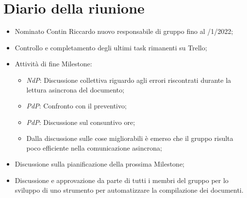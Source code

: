 \section{Diario della riunione}
\begin{itemize}
  \item Nominato Contin Riccardo nuovo responsabile di gruppo fino al 
  /1/2022;
  \item Controllo e completamento degli ultimi task rimanenti su Trello;
  \item Attività di fine Milestone:
  \begin{itemize}
    \item \textit{NdP}: Discussione collettiva riguardo agli errori riscontrati durante la lettura asincrona del documento;
    \item \textit{PdP}: Confronto con il preventivo;
    \item \textit{PdP}: Discussione sul consuntivo ore;
    \item Dalla discussione sulle cose migliorabili è emerso che il gruppo risulta poco efficiente nella comunicazione asincrona;
  \end{itemize}
  \item Discussione sulla pianificazione della prossima Milestone;
  \item Discussione e approvazione da parte di tutti i membri del gruppo per lo sviluppo di uno strumento per automatizzare la compilazione dei documenti.
\end{itemize}
